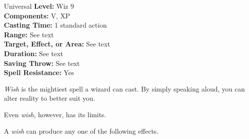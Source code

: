 {Universal}
{
	\textbf{Level:}
	Wiz 9\\
	\textbf{Components:}
	V, XP\\
	\textbf{Casting Time:}
	1 standard action\\
	\textbf{Range:}
	See text\\
	\textbf{Target, Effect, or Area:}
	See text\\
	\textbf{Duration:}
	See text\\
	\textbf{Saving Throw:}
	See text\\
	\textbf{Spell Resistance:}
	Yes\\
}
{
	\emph{Wish} is the mightiest spell a wizard can cast. By simply speaking aloud, you can alter reality to better suit you.

	Even \emph{wish}, however, has its limits.

	A \emph{wish} can produce any one of the following effects.

}
